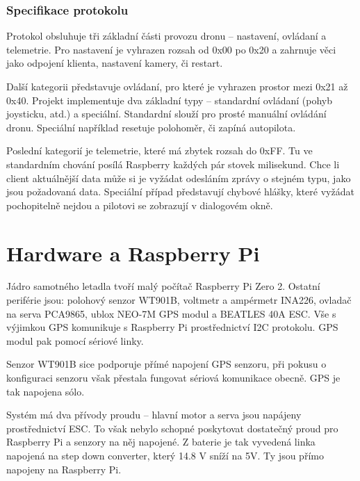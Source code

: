 \documentclass[a4paper,oneside,12pt]{report}
\begin{document}
\subsection{Specifikace protokolu}

Protokol obsluhuje tři základní části provozu dronu -- nastavení, ovládaní a telemetrie.
Pro nastavení je vyhrazen rozsah od 0x00 po 0x20 a zahrnuje věci jako odpojení klienta, nastavení kamery, či restart.

Další kategorii představuje ovládaní, pro které je vyhrazen prostor mezi 0x21 až 0x40.
Projekt implementuje dva základní typy -- standardní ovládaní (pohyb joysticku, atd.) a speciální.
Standardní slouží pro prosté manuální ovládání dronu.
Speciální například resetuje polohoměr, či zapíná autopilota.

Poslední kategorií je telemetrie, které má zbytek rozsah do 0xFF.
Tu ve standardním chování posílá Raspberry každých pár stovek milisekund.
Chce li client aktuálnější data může si je vyžádat odesláním zprávy o stejném typu, jako jsou požadovaná data.
Speciální případ představují chybové hlášky, které vyžádat pochopitelně nejdou a pilotovi se zobrazují v dialogovém okně.

\chapter{Hardware a Raspberry Pi}

Jádro samotného letadla tvoří malý počítač Raspberry Pi Zero 2.
Ostatní periférie jsou: polohový senzor WT901B, voltmetr a ampérmetr INA226, ovladač na serva PCA9865, ublox NEO-7M GPS modul a BEATLES 40A ESC.
Vše s výjimkou GPS komunikuje s Raspberry Pi prostřednictví I2C protokolu.
GPS modul pak pomocí sériové linky.

Senzor WT901B sice podporuje přímé napojení GPS senzoru, při pokusu o konfiguraci senzoru však přestala fungovat sériová komunikace obecně.
GPS je tak napojena sólo.

Systém má dva přívody proudu -- hlavní motor a serva jsou napájeny prostřednictví ESC.
To však nebylo schopné poskytovat dostatečný proud pro Raspberry Pi a senzory na něj napojené.
Z baterie je tak vyvedená linka napojená na step down converter, který 14.8 V sníží na 5V.
Ty jsou přímo napojeny na Raspberry Pi.
\end{document}
